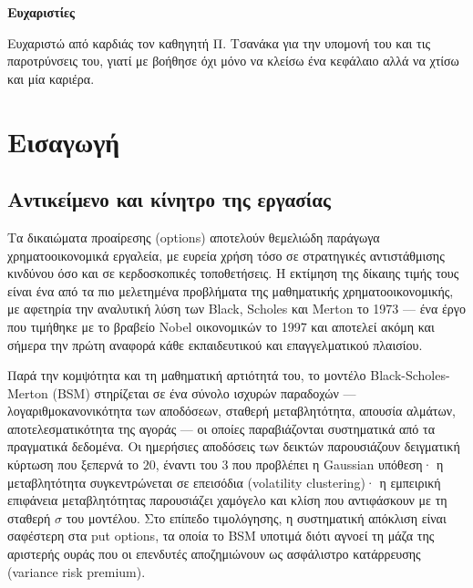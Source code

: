 \documentclass[12pt]{article}
\begin{document}
\newpage

\begin{center}
\begin{large}\textbf{Ευχαριστίες}\end{large}
\end{center}

Ευχαριστώ από καρδιάς τον καθηγητή Π. Τσανάκα για την υπομονή του και τις παροτρύνσεις του, γιατί με βοήθησε όχι μόνο να κλείσω ένα κεφάλαιο αλλά να χτίσω και μία καριέρα. 

\newpage

\tableofcontents
\newpage
\listoffigures
\newpage
\listoftables
\newpage

\section{Εισαγωγή}

\subsection{Αντικείμενο και κίνητρο της εργασίας}
Τα δικαιώματα προαίρεσης (options) αποτελούν θεμελιώδη παράγωγα χρηματοοικονομικά εργαλεία, με ευρεία χρήση τόσο σε στρατηγικές αντιστάθμισης κινδύνου όσο και σε κερδοσκοπικές τοποθετήσεις. Η εκτίμηση της δίκαιης τιμής τους είναι ένα από τα πιο μελετημένα προβλήματα της μαθηματικής χρηματοοικονομικής, με αφετηρία την αναλυτική λύση των Black, Scholes και Merton το 1973 — ένα έργο που τιμήθηκε με το βραβείο Νobel οικονομικών το 1997 και αποτελεί ακόμη και σήμερα την πρώτη αναφορά κάθε εκπαιδευτικού και επαγγελματικού πλαισίου.

Παρά την κομψότητα και τη μαθηματική αρτιότητά του, το μοντέλο Black-Scholes-Merton (BSM) στηρίζεται σε ένα σύνολο ισχυρών παραδοχών — λογαριθμοκανονικότητα των αποδόσεων, σταθερή μεταβλητότητα, απουσία αλμάτων, αποτελεσματικότητα της αγοράς — οι οποίες παραβιάζονται συστηματικά από τα πραγματικά δεδομένα. Οι ημερήσιες αποδόσεις των δεικτών παρουσιάζουν δειγματική κύρτωση που ξεπερνά το $20$, έναντι του $3$ που προβλέπει η Gaussian υπόθεση· η μεταβλητότητα συγκεντρώνεται σε επεισόδια (volatility clustering)· η εμπειρική επιφάνεια μεταβλητότητας παρουσιάζει χαμόγελο και κλίση που αντιφάσκουν με τη σταθερή $\sigma$ του μοντέλου. Στο επίπεδο τιμολόγησης, η συστηματική απόκλιση είναι σαφέστερη στα put options, τα οποία το BSM υποτιμά διότι αγνοεί τη μάζα της αριστερής ουράς που οι επενδυτές αποζημιώνουν ως ασφάλιστρο κατάρρευσης (variance risk premium).
\end{document}
